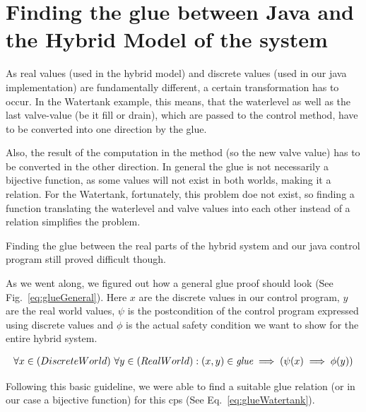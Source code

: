 \section{Finding the glue between Java and the Hybrid Model of the system}
\label{sec:Watertank:Glue}

As real values (used in the hybrid model) and discrete values (used in our java implementation) are fundamentally different, a certain transformation has to occur.  In the Watertank example, this means, that the waterlevel as well as the last valve-value (be it fill or drain), which are passed to the control method, have to be converted into one direction by the glue. 

Also, the result of the computation in the method (so the new valve value) has to be converted in the other direction. In general the glue is not necessarily a bijective function, as some values will not exist in both worlds, making it a relation. For the Watertank, fortunately, this problem doe not exist, so finding a function translating the waterlevel and valve values into each other instead of a relation simplifies the problem.

Finding the glue between the real parts of the hybrid system and our java control program still proved difficult though.

As we went along, we figured out how a general glue proof should look (See Fig.~\ref{eq:glueGeneral}). Here \(x\) are the discrete values in our control program, \(y\) are the real world values, \(\psi\) is the postcondition of the control program expressed using discrete values and \(\phi\) is the actual safety condition we want to show for the entire hybrid system.

\begin{equation}
	\centering
	\begin{split}
		\forall x \in (Discrete World)~\forall y \in (Real World):(x,y) \in \textit{glue} \implies (\psi(x) \implies \phi(y))
	\end{split}
	\label{eq:glueGeneral}
\end{equation}

Following this basic guideline, we were able to find a suitable glue relation (or in our case a bijective function) for this cps (See Eq.~\ref{eq:glueWatertank}).

